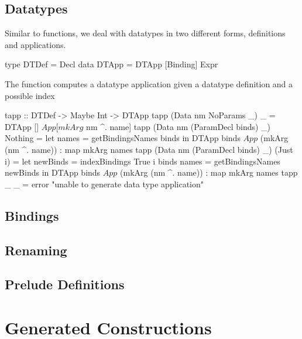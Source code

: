 \subsection{Datatypes}
Similar to functions, we deal with datatypes in two different forms, definitions and applications. 
\begin{hscode}
type DTDef = Decl
data DTApp = DTApp [Binding] Expr 
\end{hscode}
The function  computes a datatype application given a datatype definition and a possible index 
\begin{hscode}
tapp :: DTDef -> Maybe Int -> DTApp 
tapp (Data nm NoParams _) _ = DTApp [] $ App [mkArg $ nm ^. name]
tapp (Data nm (ParamDecl binds) _) Nothing =
  let names = getBindingsNames binds 
  in DTApp binds $ App $ (mkArg (nm ^. name)) : map mkArg names  
tapp (Data nm (ParamDecl binds) _) (Just i) =
  let newBinds = indexBindings True i binds
       names = getBindingsNames newBinds 
  in DTApp binds $ App $ (mkArg (nm ^. name)) : map mkArg names  
tapp _ _ = error "unable to generate data type application" 
\end{hscode}

\subsection{Bindings}

\subsection{Renaming}

\subsection{Prelude Definitions}



\section{Generated Constructions}
\label{sec:generatedConstructions}


